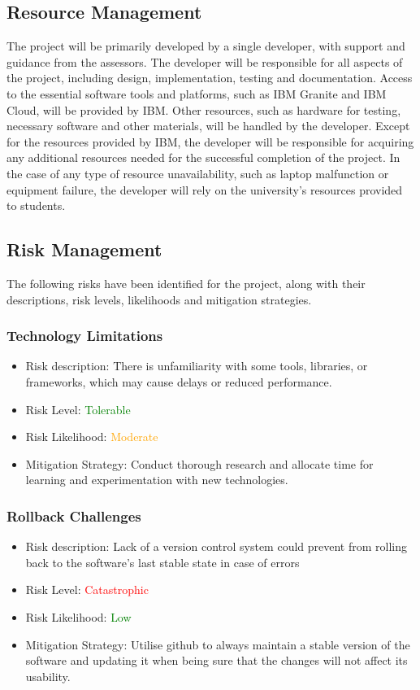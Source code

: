 \documentclass[12pt]{article}
\begin{document}
    \subsection{Resource Management}
    
    The project will be primarily developed by a single developer, with support and guidance from the assessors. The developer will be responsible for all aspects of the project, including design, implementation, testing and documentation.
    Access to the essential software tools and platforms, such as IBM Granite and IBM Cloud, will be provided by IBM. Other resources, such as hardware for testing, necessary software and other materials, will be handled by the developer. Except for the
    resources provided by IBM, the developer will be responsible for acquiring any additional resources needed for the successful completion of the project. In the case of any type of resource unavailability, such as laptop malfunction or equipment failure, the
    developer will rely on the university's resources provided to students.


    \subsection{Risk Management}
    The following risks have been identified for the project, along with their descriptions, risk levels, likelihoods and mitigation strategies.
        \subsubsection{Technology Limitations}
        \begin{itemize}
            \item Risk description: There is unfamiliarity with some tools, libraries, or frameworks, which may cause delays or reduced performance. 
            \item Risk Level: \textcolor{green}{Tolerable}
            \item Risk Likelihood: \textcolor{orange}{Moderate}
            \item Mitigation Strategy: Conduct thorough research and allocate time for learning and experimentation with new technologies.
        \end{itemize}

        \subsubsection{Rollback Challenges}
        \begin{itemize}
            \item Risk description: Lack of a version control system could prevent from rolling back to the software's last stable state in case of errors
            \item Risk Level: \textcolor{red}{Catastrophic}
            \item Risk Likelihood: \textcolor{green}{Low}
            \item Mitigation Strategy: Utilise github to always maintain a stable version of the software and updating it when being sure that the changes will not affect its usability. 
        \end{itemize}
\end{document}
